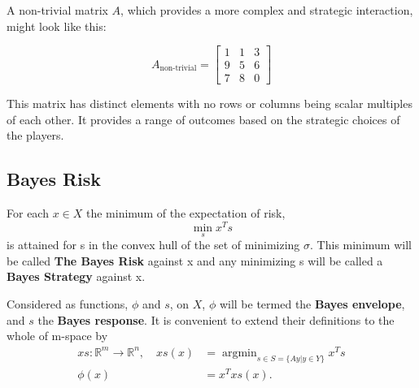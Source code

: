 \documentclass[11pt]{article}
\DeclareMathOperator*{\argmin}{argmin}
\theoremstyle{boldStyle}
\begin{document}
A non-trivial matrix \( A \), which provides a more complex and strategic interaction, might look like this:

\begin{equation} \label{eq:nontrivial}
    A_{\text{non-trivial}} = \begin{bmatrix}
    1 & 1 & 3 \\
    9 & 5 & 6 \\
    7 & 8 & 0
    \end{bmatrix}
\end{equation}

This matrix has distinct elements with no rows or columns being scalar multiples of each other. It provides a range of outcomes based on the strategic choices of the players. 



\subsection{Bayes Risk}

For each $x \in X$ the minimum of the expectation of risk, 
\[
    \min_{s} x^T s
\]
is attained for s in the convex hull of the set of minimizing $\sigma$. 
This minimum will be called \textbf{The Bayes Risk} against x and any minimizing s will be called a \textbf{Bayes Strategy} against x.

Considered as functions, $\phi$ and $s$, on $X$, $\phi$ will be termed the \textbf{Bayes envelope}, and $s$ the \textbf{Bayes response}.
It is convenient to extend their definitions to the whole of m-space by 
\begin{equation}
    \begin{aligned}
        xs : \mathbb{R}^m \rightarrow \mathbb{R}^n, \quad xs(x) &= \argmin_{s \in S = \{Ay | y \in Y \}} x^T s \\
        \phi(x) &=  x^T xs(x).
    \end{aligned}
\end{equation}

\newpage
\end{document}

